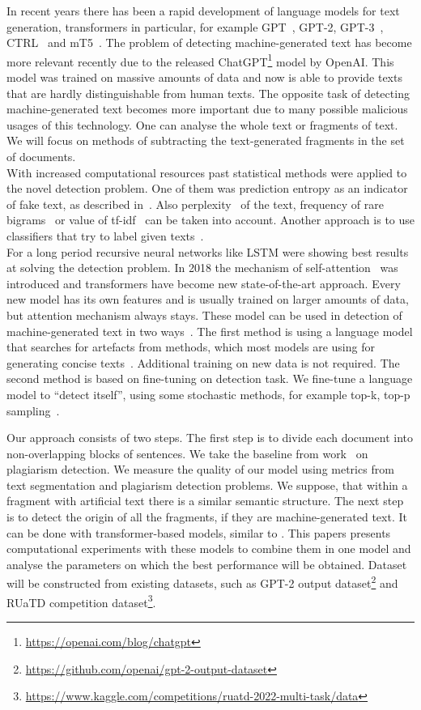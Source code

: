 \documentclass{article}
\begin{document}
In recent years there has been a rapid development of language models for text generation, transformers in particular, for example GPT~\cite{gpt}, GPT-2\cite{gpt2}, GPT-3~\cite{gpt3}, CTRL~\cite{ctrl} and mT5~\cite{mt5}. The problem of detecting machine-generated text has become more relevant recently due to the released ChatGPT\footnote{\url{https://openai.com/blog/chatgpt}} model by OpenAI. This model was trained on massive amounts of data and now is able to provide texts that are hardly distinguishable from human texts. The opposite task of detecting machine-generated text becomes more important due to many possible malicious usages of this technology. One can analyse the whole text or fragments of text.
We will focus on methods of subtracting the text-generated fragments in the set of documents.\\
With increased computational resources past statistical methods were applied to the novel detection problem. One of them was prediction entropy as an indicator of fake text, as described in~\cite{relativeentropy}. Also perplexity~\cite{perplexity} of the text, frequency of rare bigrams~\cite{rare_bigrams} or value of tf-idf~\cite{solaiman} can be taken into account. Another approach is to use classifiers that try to label given texts~\cite{Kuznetsov}.\\
For a long period recursive neural networks like LSTM were showing best results at solving the detection problem. In 2018 the mechanism of self-attention~\cite{Vaswani} was introduced and transformers have become new state-of-the-art approach.  Every new model has its own features and is usually trained on larger amounts of data, but attention mechanism always stays. These model can be used in detection of machine-generated text in two ways~\cite{solaiman}. The first method is using a language model that searches for artefacts from  methods, which most models are using for generating concise texts~\cite{gltr}. Additional training on new data is not required. The second method is based on fine-tuning on detection task. We fine-tune a language model to “detect itself”, using some stochastic methods, for example top-k, top-p sampling~\cite{gritsay2022}. 

Our approach consists of two steps. The first step is to divide each document into non-overlapping blocks of sentences. We take the baseline from work~\cite{Kuznetsov} on plagiarism detection.  We measure the quality of our model using metrics from text segmentation and plagiarism detection problems\cite{granularity}. We suppose, that within a fragment with artificial text there is a similar semantic structure.  The next step is to detect the origin of all the fragments, if they are machine-generated text. It can be done with transformer-based models, similar to \cite{gritsay2022}. This papers presents computational experiments with these models to combine them in one model and analyse the parameters on which the best performance will be obtained. Dataset will be constructed from existing datasets, such as GPT-2 output dataset\footnote{\url{https://github.com/openai/gpt-2-output-dataset}} and RUaTD competition dataset\footnote{\url{https://www.kaggle.com/competitions/ruatd-2022-multi-task/data}}.  %
\end{document}
